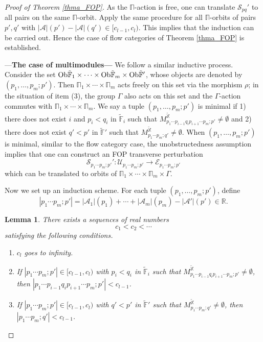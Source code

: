 \documentclass[reqno, 10pt]{amsart}
\numberwithin{equation}{section}
\numberwithin{equation}{section}
\newtheorem{lemma}[thm]{Lemma}
\theoremstyle{definition}
\theoremstyle{remark}
\newcommand{\beqn}{\begin{equation*}}
\newcommand{\eeqn}{\end{equation*}}
\newcommand{\mb}{\mathbb}
\newcommand{\mc}{\mathcal}
\begin{document}
\begin{proof}[Proof of Theorem \ref{thma_FOP}]
As the $\mb\Pi$-action is free, one can translate ${\mc S}_{pq}'$ to all pairs on the same $\mb\Pi$-orbit. Apply the same procedure for all $\mb\Pi$-orbits of pairs $p', q'$ with $|{\mc A}| (p') - | {\mc A}| (q') \in [c_{l-1}, c_l)$. This implies that the induction can be carried out. Hence the case of flow categories of Theorem \ref{thma_FOP} is established.

---{\bf The case of multimodules---} We follow a similar inductive process. Consider the set ${\rm Ob}\tilde {\mb F}_1\times \cdots \times {\rm Ob}\tilde{\mb F}_m \times {\rm Ob}\tilde{\mb F}'$, whose objects are denoted by $(p_1,\ldots, p_m; p')$. Then $\mb\Pi_1 \times \cdots \times \mb\Pi_m$ acts freely on this set via the morphism $\rho$; in the situation of item (3), the group $\Gamma$ also acts on this set and the $\Gamma$-action commutes with $\mb\Pi_1 \times \cdots \times \mb\Pi_m$. We say a tuple $(p_1, \ldots, p_m; p')$ is minimal if 1) there does not exist $i$ and $p_i < q_i$ in $\tilde{\mb F}_i$ such that $M_{p_1 \cdots p_{i-1} q_i p_{i+1} \cdots p_m; p'}^{\tilde {\mb X}} \neq \emptyset$ and 2) there does not exist $q' < p'$ in $\tilde{\mb F}'$ such that $M_{p_1 \cdots p_m; q'}^{\tilde {\mb X}} \neq \emptyset$. When $(p_1, \ldots, p_m; p')$ is minimal, similar to the flow category case, the unobstructedness assumption implies that one can construct an FOP transverse perturbation 
\beqn
{\mc S}_{p_1 \cdots p_m; p'}': {\mc U}_{p_1\cdots p_m; p'} \to {\mc E}_{p_1 \cdots p_m; p'}
\eeqn
which can be translated to orbits of $\mb\Pi_1\times \cdots \times \mb\Pi_m \times \Gamma$. 

Now we set up an induction scheme. For each tuple $(p_1, \ldots, p_m; p')$, define
\beqn
|p_1 \cdots p_m;p'| = |{\mc A}_1|(p_1) + \cdots + |{\mc A}_m|(p_m) - |{\mc A}'|(p')\in {\mb R}.
\eeqn

\begin{lemma}
There exists a sequences of real numbers
\beqn
c_1 < c_2 < \cdots
\eeqn
satisfying the following conditions.
\begin{enumerate}
    \item $c_l$ goes to infinity.

    \item If $|p_1 \cdots p_m; p'| \in [c_{l-1}, c_l)$ with $p_i < q_i$ in $\tilde{\mb F}_i$ such that $M_{p_1 \cdots p_{i-1} q_i p_{i+1} \cdots p_m; p'}^{\tilde{\mb X}} \neq \emptyset$, then $|p_1 \cdots p_{i-1} q_i p_{i+1} \cdots p_m; p'| < c_{l-1}$.

    \item If $|p_1 \cdots p_m; p'| \in [c_{l-1}, c_l)$ with $q' < p'$ in $\tilde{\mb F}'$ such that $M_{p_1 \cdots p_m; q'}^{\tilde{\mb X}} \neq \emptyset$, then $|p_1 \cdots p_m; q'| < c_{l-1}$.


\end{enumerate}
\end{lemma}
\end{proof}
\end{document}
